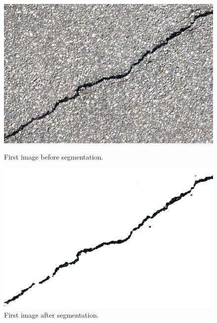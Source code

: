 \begin{figure}[h]
	\centering
	\begin{minipage}{0.45\textwidth}
		\centering
		\includegraphics[width=\linewidth]{images/source/original/1}
		\caption{First image before segmentation.}
		\label{fig:1a}
        \end{minipage}
        \hspace{0.05\textwidth}
        \begin{minipage}{0.45\textwidth}
        		\centering
		\includegraphics[width=\linewidth]{images/source/task1/1}
		\caption{First image after segmentation.}
		\label{fig:1b}
        \end{minipage}
\end{figure}

